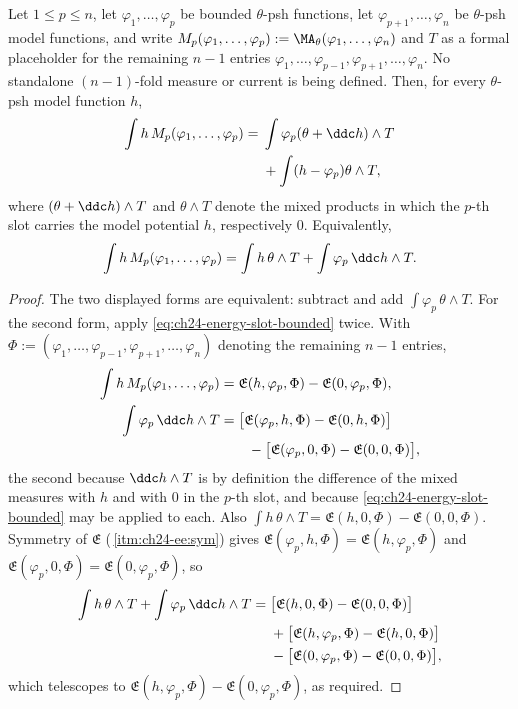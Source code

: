 \begin{proposition}
\label{prop:ch24-forced-ibp}
Let $1\leq p\leq n$, let $\varphi_1,\ldots,\varphi_p$ be bounded
$\theta$-psh functions, let $\varphi_{p+1},\ldots,\varphi_n$ be
$\theta$-psh model functions, and write
$M_p(\varphi_1,\ldots,\varphi_p):=
\MA_\theta(\varphi_1,\ldots,\varphi_n)$ and
$T$ as a formal placeholder for the remaining $n-1$ entries
$\varphi_1,\ldots,\varphi_{p-1},\varphi_{p+1},\ldots,\varphi_n$.
No standalone $(n-1)$-fold measure or current is being defined.
Then, for every $\theta$-psh model function $h$,
\begin{equation}
\label{eq:inductive-ma-definition}
\begin{split}
 \int h\,M_p(\varphi_1,\ldots,\varphi_p)
 ={}&\int\varphi_p(\theta+\ddc h)\wedge T\\
     &+\int(h-\varphi_p)\theta\wedge T,
\end{split}
\end{equation}
where $(\theta+\ddc h)\wedge T$ and $\theta\wedge T$ denote the mixed
products in which the $p$-th slot carries the model potential $h$,
respectively $0$.  Equivalently,
\[
 \int h\,M_p(\varphi_1,\ldots,\varphi_p)
 =\int h\,\theta\wedge T+\int\varphi_p\,\ddc h\wedge T .
\]
\end{proposition}

\begin{proof}
The two displayed forms are equivalent: subtract and add
$\int\varphi_p\,\theta\wedge T$.  For the second form, apply
\eqref{eq:ch24-energy-slot-bounded} twice.  With
$\Phi:=(\varphi_1,\ldots,\varphi_{p-1},\varphi_{p+1},\ldots,\varphi_n)$
denoting the remaining $n-1$ entries,
\[
 \begin{aligned}
 \int h\,M_p(\varphi_1,\ldots,\varphi_p)
   &=\mathfrak E(h,\varphi_p,\Phi)-\mathfrak E(0,\varphi_p,\Phi),\\
  \int\varphi_p\,\ddc h\wedge T
     &=\bigl[\mathfrak E(\varphi_p,h,\Phi)-\mathfrak E(0,h,\Phi)\bigr]\\
     &\qquad-\bigl[\mathfrak E(\varphi_p,0,\Phi)-\mathfrak E(0,0,\Phi)\bigr],
 \end{aligned}
\]
the second because $\ddc h\wedge T$ is by definition the difference of the
mixed measures with $h$ and with $0$ in the $p$-th slot, and because
\eqref{eq:ch24-energy-slot-bounded} may be applied to each.  Also
$\int h\,\theta\wedge T=\mathfrak E(h,0,\Phi)-\mathfrak E(0,0,\Phi)$.
Symmetry of $\mathfrak E$
(\,\cref{itm:ch24-ee:sym}) gives
$\mathfrak E(\varphi_p,h,\Phi)=\mathfrak E(h,\varphi_p,\Phi)$ and
$\mathfrak E(\varphi_p,0,\Phi)=\mathfrak E(0,\varphi_p,\Phi)$, so
  \begin{align*}
 \int h\,\theta\wedge T+\int\varphi_p\,\ddc h\wedge T
 ={}&\bigl[\mathfrak E(h,0,\Phi)-\mathfrak E(0,0,\Phi)\bigr]\\
 &+\bigl[\mathfrak E(h,\varphi_p,\Phi)-\mathfrak E(h,0,\Phi)\bigr]\\
 &-\bigl[\mathfrak E(0,\varphi_p,\Phi)-\mathfrak E(0,0,\Phi)\bigr],
  \end{align*}
which telescopes to
$\mathfrak E(h,\varphi_p,\Phi)-\mathfrak E(0,\varphi_p,\Phi)$, as
required.
\end{proof}

